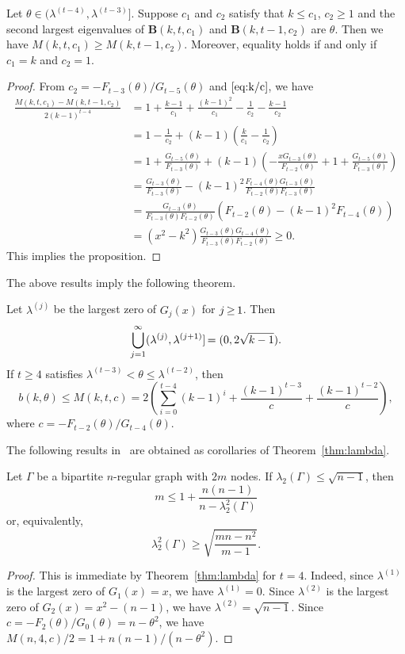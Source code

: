 \documentclass[ALCO,ThmDefs,Unicode,epreuves]{cedram}
\newcommand*{\Mk}{\mkern -2mu}
\begin{document}
\begin{prop} \label{prop:c2}
Let $\theta\in \mathopen(\lambda^{(t-4)}, \lambda^{(t-3)} \mathclose]$. 
Suppose $c_1$ and $c_2$ satisfy that $k\leq c_1$, $c_2 \geq 1$ and the second largest eigenvalues of $\boldsymbol{B}(k,t,c_1)$ and $\boldsymbol{B}(k,t-1,c_2)$ are $\theta$. 
Then we have $M(k,t,c_1)\geq M(k,t-1,c_2)$. Moreover, equality holds if and only if 
$c_1=k$ and $c_2=1$. 
\end{prop}
\begin{proof}
From 
$c_2=-F_{t-3}(\theta)/G_{t-5}(\theta)$ and $\eqref{eq:k/c}$, 
we have
\begin{align*}
\frac{M(k,t,c_1)- M(k,t-1,c_2)}{2(k-1)^{t-4}}&=
 1+\frac{k-1}{c_1}+\frac{(k-1)^2}{c_1}-\frac{1}{c_2}-\frac{k-1}{c_2}\\
&=1-\frac{1}{c_2}+(k-1)\left(
\frac{k}{c_1}-\frac{1}{c_2} \right)\\
&=1+\frac{G_{t-5}(\theta)}{F_{t-3}(\theta)}+(k-1)\left( 
-\frac{xG_{t-3}(\theta)}{F_{t-2}(\theta)}+1 +\frac{G_{t-5}(\theta)}{F_{t-3}(\theta)} \right)\\
&=\frac{G_{t-3}(\theta)}{F_{t-3}(\theta)}-(k-1)^2 \frac{F_{t-4}(\theta)G_{t-3}(\theta)}{F_{t-2}(\theta)F_{t-3}(\theta)}\\
&=\frac{G_{t-3}(\theta)}{F_{t-3}(\theta)F_{t-2}(\theta)}
(F_{t-2}(\theta)-(k-1)^2F_{t-4}(\theta))\\
&= (x^2-k^2)\frac{G_{t-3}(\theta)G_{t-4}(\theta)}{F_{t-3}(\theta)F_{t-2}(\theta)}\geq 0. 
\end{align*}
This implies the proposition. 
\end{proof}
The above results imply the following theorem. 
\begin{theo} \label{thm:lambda} 
Let $\lambda^{(j)}$ be the largest zero of $G_j(x)$ for $j\Mk \geq \Mk 1$. Then 
\[
\bigcup_{j= 1 }^\infty (\lambda^{(j)},\lambda^{(j+1)}]\Mk = (0,2 \sqrt{k-1}).
\]
 If $t\geq 4$ satisfies $\lambda^{(t-3)} < \theta \leq \lambda^{(t-2)}$, then 
\[
b(k,\theta) \leq M(k,t,c)=2\left(\sum_{i=0}^{t-4} (k-1)^{i}+ \frac{(k-1)^{t-3}}{c}+\frac{(k-1)^{t-2}}{c}\right), 
\] 
where $c=-F_{t-2}(\theta)/G_{t-4}(\theta)$. 
\end{theo}

The following results in~\cite{HJ12, HJ14} are obtained as corollaries of Theorem~\ref{thm:lambda}. 
\begin{coro}[{\cite{HJ12}}] \label{coro:0}
Let $\Gamma$ be a bipartite $n$-regular graph with $2m$ nodes. 
If 
$
\lambda_2(\Gamma) \leq \sqrt{n-1}
$,
then
\[
m \leq 1+\frac{n(n-1)}{n-\lambda_2^2(\Gamma)} 
\]
or, equivalently, 
\[
\lambda_2^2(\Gamma) \geq \sqrt{\frac{mn-n^2}{m-1}}. 
\]
\end{coro}	
\begin{proof}
This is immediate by Theorem~\ref{thm:lambda} for $t=4$. Indeed, 
since $\lambda^{(1)}$ is the largest zero of $G_1(x)=x$, we have
$\lambda^{(1)}=0$. 
Since $\lambda^{(2)}$ is the largest zero of $G_2(x)=x^2-(n-1)$, we have
$\lambda^{(2)}=\sqrt{n-1}$. 
Since $c=-F_{2}(\theta)/G_{0}(\theta)=n-\theta^2$, 
we have $M(n,4,c)/2=1+n(n-1)/(n-\theta^2)$. 
\end{proof}
\end{document}
